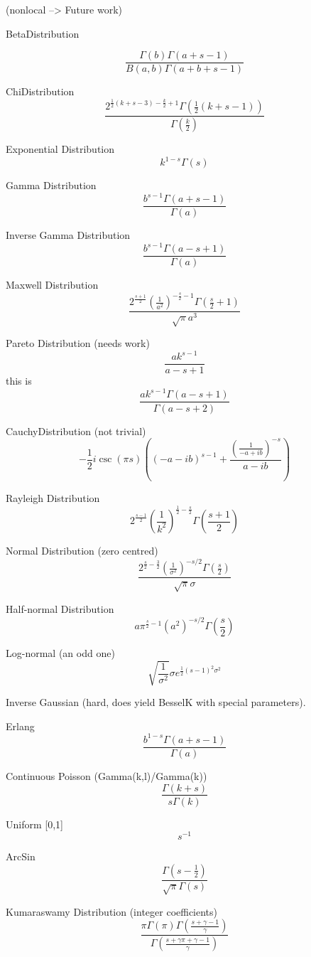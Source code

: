 \documentclass{article}
\begin{document}
(nonlocal --> Future work)

BetaDistribution 

$$
\frac{\Gamma (b) \Gamma (a+s-1)}{B(a,b) \Gamma (a+b+s-1)}
$$

ChiDistribution
$$
\frac{2^{\frac{1}{2} (k+s-3)-\frac{k}{2}+1} \Gamma \left(\frac{1}{2}
    (k+s-1)\right)}{\Gamma \left(\frac{k}{2}\right)}
$$

Exponential Distribution
$$
k^{1-s} \Gamma (s)
$$

Gamma Distribution
$$
\frac{b^{s-1} \Gamma (a+s-1)}{\Gamma (a)}
$$

Inverse Gamma Distribution
$$
\frac{b^{s-1} \Gamma (a-s+1)}{\Gamma (a)}
$$

Maxwell Distribution
$$
\frac{2^{\frac{s+1}{2}} \left(\frac{1}{a^2}\right)^{-\frac{s}{2}-1} \Gamma
    \left(\frac{s}{2}+1\right)}{\sqrt{\pi } a^3}
$$
    
Pareto Distribution (needs work)
$$
\frac{a k^{s-1}}{a-s+1}
$$
this is 
$$
\frac{a k^{s-1} \Gamma (a-s+1)}{\Gamma (a-s+2)}
$$

CauchyDistribution (not trivial)
$$
-\frac{1}{2} i \csc (\pi  s) \left((-a-i b)^{s-1}+\frac{\left(\frac{1}{-a+i
    b}\right)^{-s}}{a-i b}\right)
$$

Rayleigh Distribution
$$
2^{\frac{s-1}{2}} \left(\frac{1}{k^2}\right)^{\frac{1}{2}-\frac{s}{2}} \Gamma
    \left(\frac{s+1}{2}\right)
$$

Normal Distribution (zero centred)
$$
\frac{2^{\frac{s}{2}-\frac{3}{2}} \left(\frac{1}{\sigma ^2}\right)^{-s/2} \Gamma
    \left(\frac{s}{2}\right)}{\sqrt{\pi } \sigma }
$$
    
Half-normal Distribution
$$
a \pi ^{\frac{s}{2}-1} \left(a^2\right)^{-s/2} \Gamma \left(\frac{s}{2}\right)
$$    
  
Log-normal (an odd one)
$$
\sqrt{\frac{1}{\sigma ^2}} \sigma  e^{\frac{1}{2} (s-1)^2 \sigma ^2}
$$

Inverse Gaussian (hard, does yield BesselK with special parameters).

Erlang
$$
\frac{b^{1-s} \Gamma (a+s-1)}{\Gamma (a)}
$$

Continuous Poisson  (Gamma(k,l)/Gamma(k))
$$
\frac{\Gamma(k+s)}{s \Gamma(k) }
$$

Uniform [0,1]
$$
s^{-1}
$$

ArcSin
$$
\frac{\Gamma \left(s-\frac{1}{2}\right)}{\sqrt{\pi } \Gamma (s)}
$$

Kumaraswamy Distribution (integer coefficients)
$$
\frac{\pi  \Gamma (\pi ) \Gamma \left(\frac{s+\gamma -1}{\gamma }\right)}{\Gamma
    \left(\frac{s+\gamma  \pi +\gamma -1}{\gamma }\right)}
$$
\end{document}

